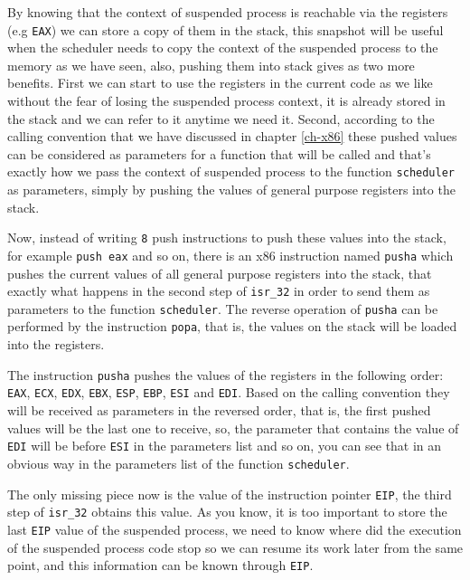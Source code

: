 By knowing that the context of suspended process is reachable via the
registers (e.g \lstinline!EAX!) we can store a copy of them in the
stack, this snapshot will be useful when the scheduler needs to copy the
context of the suspended process to the memory as we have seen, also,
pushing them into stack gives as two more benefits. First we can start
to use the registers in the current code as we like without the fear of
losing the suspended process context, it is already stored in the stack
and we can refer to it anytime we need it. Second, according to the
calling convention that we have discussed in chapter \ref{ch-x86} these
pushed values can be considered as parameters for a function that will
be called and that's exactly how we pass the context of suspended
process to the function \lstinline!scheduler! as parameters, simply by
pushing the values of general purpose registers into the stack.

Now, instead of writing \lstinline!8! push instructions to push these
values into the stack, for example \lstinline!push eax! and so on, there
is an x86 instruction named \lstinline!pusha! which pushes the current
values of all general purpose registers into the stack, that exactly
what happens in the second step of \lstinline!isr_32! in order to send
them as parameters to the function \lstinline!scheduler!. The reverse
operation of \lstinline!pusha! can be performed by the instruction
\lstinline!popa!, that is, the values on the stack will be loaded into
the registers.

The instruction \lstinline!pusha! pushes the values of the registers in
the following order: \lstinline!EAX!, \lstinline!ECX!, \lstinline!EDX!,
\lstinline!EBX!, \lstinline!ESP!, \lstinline!EBP!, \lstinline!ESI! and
\lstinline!EDI!. Based on the calling convention they will be received
as parameters in the reversed order, that is, the first pushed values
will be the last one to receive, so, the parameter that contains the
value of \lstinline!EDI! will be before \lstinline!ESI! in the
parameters list and so on, you can see that in an obvious way in the
parameters list of the function \lstinline!scheduler!.

The only missing piece now is the value of the instruction pointer
\lstinline!EIP!, the third step of \lstinline!isr_32! obtains this
value. As you know, it is too important to store the last
\lstinline!EIP! value of the suspended process, we need to know where
did the execution of the suspended process code stop so we can resume
its work later from the same point, and this information can be known
through \lstinline!EIP!.


